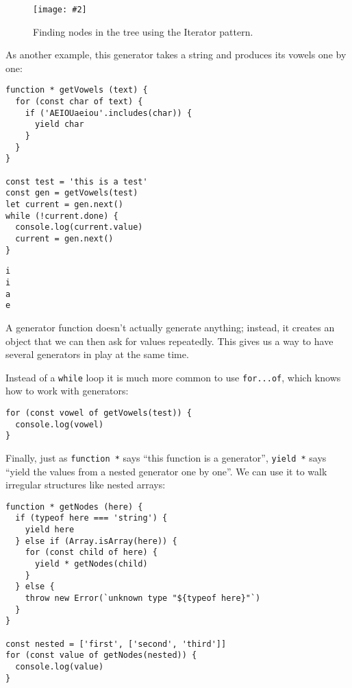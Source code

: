 \documentclass[krantzl]{krantz}
\newcommand{\figpdfhere}[4]{\begin{figure}[h]%
\centering%
\texttt{[image: \#2]}%
\caption{#3}%
\label{#1}%
\end{figure}}
\begin{document}
\figpdfhere{style-checker-iterator}{./style-checker/iterator.pdf}{Finding nodes in the tree using the Iterator pattern.}{0.6}


As another example,
this generator takes a string and produces its vowels one by one:


\begin{lstlisting}[frame=tblr]
function * getVowels (text) {
  for (const char of text) {
    if ('AEIOUaeiou'.includes(char)) {
      yield char
    }
  }
}

const test = 'this is a test'
const gen = getVowels(test)
let current = gen.next()
while (!current.done) {
  console.log(current.value)
  current = gen.next()
}
\end{lstlisting}



\begin{lstlisting}[frame=tblr,backgroundcolor=\color{black!5}]
i
i
a
e
\end{lstlisting}



\noindent A generator function doesn’t actually generate anything;
instead,
it creates an object that we can then ask for values repeatedly.
This gives us a way to have several generators in play at the same time.


Instead of a \texttt{while} loop it is much more common to use \texttt{for...of},
which knows how to work with generators:


\begin{lstlisting}[frame=tblr]
for (const vowel of getVowels(test)) {
  console.log(vowel)
}
\end{lstlisting}



Finally,
just as \texttt{function *} says “this function is a generator”,
\texttt{yield *} says “yield the values from a nested generator one by one”.
We can use it to walk irregular structures like nested arrays:


\begin{lstlisting}[frame=tblr]
function * getNodes (here) {
  if (typeof here === 'string') {
    yield here
  } else if (Array.isArray(here)) {
    for (const child of here) {
      yield * getNodes(child)
    }
  } else {
    throw new Error(`unknown type "${typeof here}"`)
  }
}

const nested = ['first', ['second', 'third']]
for (const value of getNodes(nested)) {
  console.log(value)
}
\end{lstlisting}
\end{document}
